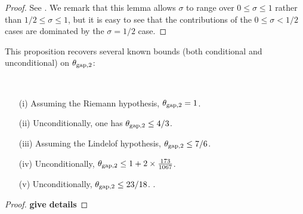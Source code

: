 \begin{proof} See \cite[Lemma 2]{heath_brown_consecutive_II}. We remark that this lemma allows $\sigma$ to range over $0 \leq \sigma \leq 1$ rather than $1/2 \leq \sigma \leq 1$, but it is easy to see that the contributions of the $0 \leq \sigma < 1/2$ cases are dominated by the $\sigma=1/2$ case.
\end{proof}

This proposition recovers several known bounds (both conditional and unconditional) on $\theta_{\mathrm{gap},2}$:

\begin{corollary}\
    \begin{itemize}
    \item[(i)] Assuming the Riemann hypothesis, $\theta_{\mathrm{gap},2} = 1$.  \cite{selberg_1943}
    \item[(ii)] Unconditionally, one has $\theta_{\mathrm{gap},2} \leq 4/3$.  \cite{heath_brown_consecutive_I}
    \item[(iii)] Assuming the Lindelof hypothesis, $\theta_{\mathrm{gap},2} \leq 7/6$. \cite{heath_brown_consecutive_II}
    \item[(iv)] Unconditionally, $\theta_{\mathrm{gap},2} \leq 1 + 2 \times \frac{173}{1067}$. \cite[\S 7]{heath_brown_consecutive_II}
    \item[(v)] Unconditionally, $\theta_{\mathrm{gap},2} \leq 23/18$. \cite[Theorem 12.14]{ivic}.
\end{itemize}
\end{corollary}

\begin{proof} {\bf give details}
\end{proof}
